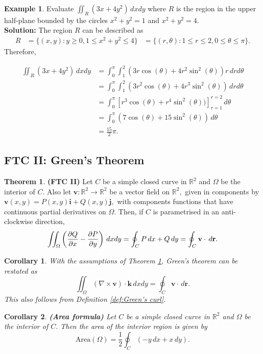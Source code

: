 \documentclass[12pt, a4paper]{article}
\newcommand{\bb}[1]{\mathbb{#1}}
\newcommand{\f}[2]{\frac{#1}{#2}}
\newcommand{\mb}[1]{\mathbf{#1}}
\theoremstyle{definition}
\newtheorem{theorem}{Theorem}[section]
\newtheorem*{example}{Example}
\theoremstyle{plain}
\newtheorem{corollary}{Corollary}[theorem]
\begin{document}
\begin{example}
Evaluate $\iint_R (3x+4y^2) \, dxdy$ where $R$ is the region in the upper half-plane bounded by the circles $x^2+y^2=1$ and $x^2+y^2=4.$ \\
\textbf{Solution:} The region $R$ can be described as $$\begin{aligned}
R&=\{(x,y) : y \geq 0, 1\leq x^2+y^2\leq 4\}
&=\{(r,\theta): 1\leq r\leq 2, 0\leq \theta\leq \pi\}.
\end{aligned}$$ Therefore,

$$\begin{aligned}
\iint_R (3x+4y^2) \, dxdy &= \int_0^{\pi}\int_1^2(3r\cos(\theta)+4r^2\sin^2(\theta))r\, drd\theta \\
	&=\int_0^{\pi}\int_1^2(3r^2\cos(\theta)+4r^3\sin^2(\theta))\, drd\theta \\
	&=\int_0^{\pi}\left[r^3\cos(\theta)+r^4\sin^2(\theta))\right]_{r=1}^{r=2} \, d\theta \\
	&= \int_0^{\pi} (7\cos(\theta)+15\sin^2(\theta))\, d\theta \\
	&= \f{15}{2}\pi.
\end{aligned}$$
\end{example}

\subsection{FTC II: Green's Theorem}

\begin{theorem}\label{th:Green}
\textbf{(FTC II)} Let $C$ be a simple closed curve in $\bb{R}^2$ and $\Omega$ be the interior of $C.$ Also let $\mb{v} : \bb{R}^2 \to \bb{R}^2$ be a vector field on $\bb{R}^2,$ given in components by $\mb{v}(x,y) = P(x,y)\mb{i} + Q(x,y)\mb{j},$ with components functions that have continuous partial derivatives on $\Omega.$ Then, if $C$ is parametrised in an anti-clockwise direction, $$\iint_{\Omega}\left(\pdv{Q}{x}-\pdv{P}{y}\right)\,dxdy=\oint_C P\, dx+Q\, dy=\oint_C \mb{v}\cdot \, d\mb{r}.$$
\end{theorem}

\begin{corollary}
With the assumptions of Theorem \ref{th:Green}, Green's theorem can be restated as $$\iint_{\Omega} \left(\nabla \times \mb{v}\right)\cdot \mb{k} \, dxdy =\oint_C \mb{v}\cdot \, d\mb{r}.$$ This also follows from Definition \ref{def:Green's curl}.
\end{corollary}

\begin{corollary}
\textbf{(Area formula)} Let $C$ be a simple closed curve in $\bb{R}^2$ and $\Omega$ be the interior of $C.$ Then the area of the interior region is given by $$\text{Area}(\Omega)=\f{1}{2}\oint_C (-y \, dx +x\, dy).$$
\end{corollary}
\end{document}
